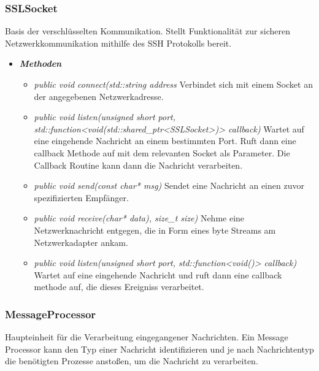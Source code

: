 \documentclass[a4paper,12pt]{article}
\begin{document}
\subsubsection{SSLSocket}

Basis der verschlüsselten Kommunikation. Stellt Funktionalität zur sicheren Netzwerkkommunikation mithilfe des SSH Protokolls bereit.

	\begin{itemize}[label={}]

	\item\textit{\textbf{Methoden}}
		\begin{itemize}[label={\textbullet}]
			\item\textit{public void connect(std::string address} Verbindet sich mit einem Socket an der angegebenen Netzwerkadresse.
			\item\textit{public void listen(unsigned short port, std::function<void(std::shared\_ptr<SSLSocket>)> callback)} Wartet auf eine eingehende Nachricht an einem bestimmten Port. Ruft dann eine callback Methode auf mit dem relevanten Socket als Parameter. Die Callback Routine kann dann die Nachricht verarbeiten.
			\item\textit{public void send(const char* msg)} Sendet eine Nachricht an einen zuvor spezifizierten Empfänger.
			\item\textit{public void receive(char* data), size\_t size)} Nehme eine Netzwerknachricht entgegen, die in Form eines byte Streams am Netzwerkadapter ankam.
			\item\textit{public void listen(unsigned short port, std::function<void()> callback)} Wartet auf eine eingehende Nachricht und ruft dann eine callback methode auf, die dieses Ereigniss verarbeitet.

		\end{itemize}

\end{itemize}


\subsubsection{MessageProcessor}

Haupteinheit für die Verarbeitung eingegangener Nachrichten. Ein Message Processor kann den Typ einer Nachricht identifizieren und je nach Nachrichtentyp die benötigten Prozesse anstoßen, um die Nachricht zu verarbeiten.
\end{document}
